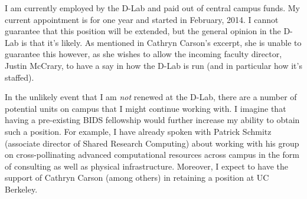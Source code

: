 





I am currently employed by the D-Lab and paid out of central campus funds. My
current appointment is for one year and started in February, 2014. I cannot
guarantee that this position will be extended, but the general opinion in the
D-Lab is that it's likely. As mentioned in Cathryn Carson's excerpt, she is
unable to guarantee this however, as she wishes to allow the incoming faculty
director, Justin McCrary, to have a say in how the D-Lab is run (and in
particular how it's staffed).

In the unlikely event that I am \emph{not} renewed at the D-Lab, there are a
number of potential units on campus that I might continue working with. I
imagine that having a pre-existing BIDS fellowship would further increase my
ability to obtain such a position. For example, I have already spoken with
Patrick Schmitz (associate director of Shared Research Computing) about working
with his group on cross-pollinating advanced computational resources across
campus in the form of consulting as well as physical infrastructure. Moreover, I
expect to have the support of Cathryn Carson (among others) in retaining a
position at UC Berkeley.



